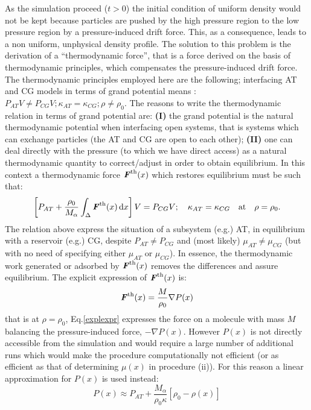 \documentclass[aps,prb,preprint,citeautoscript]{revtex4}
\renewcommand{\v}[1]{\textbf{\textit{#1}}}
\begin{document}
As the simulation proceed ($t>0$) the initial condition of uniform density would not be kept because particles are pushed by the high pressure region to the low pressure region by a pressure-induced drift force. This, as a consequence, leads to a non uniform, unphysical density profile. The solution to this problem is the derivation of a ``thermodynamic force'', that is a force derived on the basis of thermodynamic principles, which compensates the pressure-induced drift force. The thermodynamic principles employed here are the following; interfacing AT and CG models in terms of grand potential means :$P_{AT}V\neq P_{CG}V; \kappa_{AT} =  \kappa_{CG}; \rho\neq \rho_{0}$. The reasons to write the thermodynamic relation in terms of grand potential are: {\bf (I)}  the grand potential is the natural thermodynamic potential when interfacing open systems, that is systems which can exchange particles (the AT and CG are open to each other); {\bf (II)} one can deal directly with the pressure (to which we have direct access) as a natural thermodynamic quantity to correct/adjust in order to obtain equilibrium. In this context a thermodynamic force ${\v F}^{\textrm{th}}(x)$ which restores equilibrium must be such that: 
\begin{equation}
\left[P_{AT}+ \frac{\rho_{0}}{M_\alpha}\int_{\Delta} {\v F}^\text{th}(x)\,\text{d}x\right] V =P_{CG}V; \quad\kappa_{AT} =  \kappa_{CG}\quad \text{at}\quad\rho=\rho_{0}.
\label{thf}
\end{equation}
The relation above express the situation of a subsystem (e.g.) AT, in equilibrium with a reservoir (e.g.) CG, despite $P_{AT}\neq P_{CG}$ and
(most likely) $\mu_{AT}\neq\mu_{CG}$ (but with no need of specifying either $\mu_{AT}$ or $\mu_{CG}$). In essence, the thermodynamic work generated or adsorbed by ${\v F}^{\textrm{th}}(x)$ removes the differences and assure equilibrium. The explicit expression of ${\v F}^{\textrm{th}}(x)$ is:
\begin{equation}
{\v F}^{\textrm{th}}(x)=\frac{M}{\rho_{0}}\nabla P(x)
\label{explexpr}
\end{equation}
that is at $\rho=\rho_{0}$, Eq.\ref{explexpr} expresses the force on a molecule with mass $M$ balancing the pressure-induced force, $-\nabla P(x)$.
However $P(x)$ is not directly accessible from the simulation and would require a large number of additional runs which would make the procedure computationally not efficient (or as efficient as that of determining $\mu(x)$ in procedure (ii)). For this reason a linear approximation for $P(x)$ is used instead:
\begin{equation}
P(x)\approx P_{AT}+\frac{M_{\alpha}}{\rho_{0}\kappa}[\rho_{0}-\rho(x)]
\label{linearapp}
\end{equation}
\end{document}
